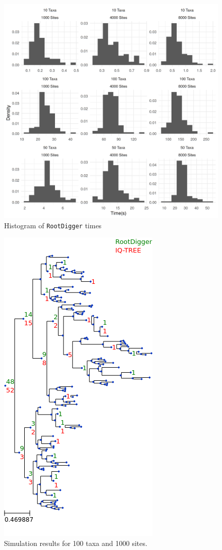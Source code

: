 \documentclass{article}
\newcommand{\RootDiggertt}{\texttt{RootDigger}}
\begin{document}
\begin{figure}
  \begin{center}
    \includegraphics[width=.9\linewidth]{./figs/timing_plots/rd_time_hist.png}
    \caption{Histogram of \RootDiggertt{} times
    \label{fig:rd_time_results}}
\end{center}
\end{figure}

\begin{figure}
  \includegraphics{figs/sim_results/100_1000.png}
  \caption{Simulation results for 100 taxa and 1000
  sites. \label{fig:sim-results-100t-1000s}}
\end{figure}
\end{document}
